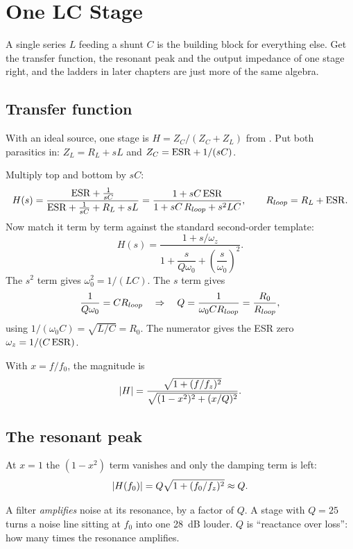 \chapter{One LC Stage}
\label{ch:single-stage}

A single series $L$ feeding a shunt $C$ is the building block for everything
else. Get the transfer function, the resonant peak and the output impedance of
one stage right, and the ladders in later chapters are just more of the same algebra.

\section{Transfer function}

With an ideal source, one stage is $H = Z_C/(Z_C + Z_L)$ from
. Put both parasitics in:
$Z_L = R_L + sL$ and $Z_C = \mathrm{ESR} + 1/(sC)$.

\begin{derivation}
	Multiply top and bottom by $sC$:
	\[
		H(s) = \frac{\mathrm{ESR} + \frac{1}{sC}}{\mathrm{ESR} + \frac{1}{sC} + R_L + sL}
		= \frac{1 + sC\,\mathrm{ESR}}{1 + sC\,R_{loop} + s^2 LC},
		\qquad R_{loop} = R_L + \mathrm{ESR}.
	\]
	Now match it term by term against the standard second-order template:
	\[
		H(s) = \frac{1 + s/\omega_z}{1 + \dfrac{s}{Q\omega_0} + \left(\dfrac{s}{\omega_0}\right)^2}.
	\]
	The $s^2$ term gives $\omega_0^2 = 1/(LC)$. The $s$ term gives
	\[
		\frac{1}{Q\omega_0} = CR_{loop}
		\quad\Rightarrow\quad
		Q = \frac{1}{\omega_0 C R_{loop}} = \frac{R_0}{R_{loop}},
	\]
	using $1/(\omega_0 C) = \sqrt{L/C} = R_0$. The numerator gives the ESR zero
	$\omega_z = 1/(C\,\mathrm{ESR})$.
\end{derivation}

With $x = f/f_0$, the magnitude is
\begin{equation}\label{eq:H-single-mag}
	\lvert H\rvert = \frac{\sqrt{1 + (f/f_z)^2}}{\sqrt{(1 - x^2)^2 + (x/Q)^2}}.
\end{equation}

\section{The resonant peak}

At $x = 1$ the $(1 - x^2)$ term vanishes and only the damping term is left:
\begin{equation}\label{eq:H-peak}
	\lvert H(f_0)\rvert = Q\sqrt{1 + (f_0/f_z)^2} \approx Q.
\end{equation}

\begin{idea}
	A filter \emph{amplifies} noise at its resonance, by a factor of $Q$.
	A stage with $Q = 25$ turns a noise line sitting at $f_0$ into one 28~dB
	louder. $Q$ is ``reactance over loss'': how many times the resonance amplifies.
\end{idea}

